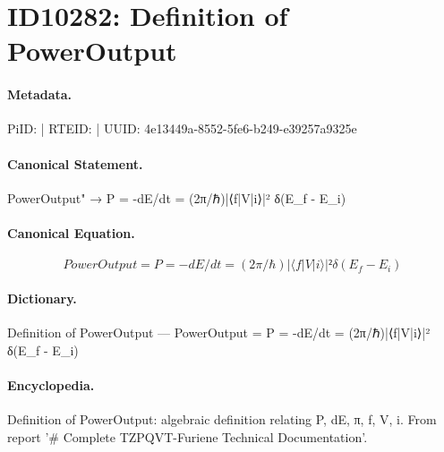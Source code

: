 \section*{ID10282: Definition of PowerOutput}
\paragraph{Metadata.}
PiID:  | RTEID:  | UUID: 4e13449a-8552-5fe6-b249-e39257a9325e

\paragraph{Canonical Statement.}
PowerOutput" → P = -dE/dt = (2π/ℏ)|⟨f|V|i⟩|² δ(E\_f - E\_i)

\paragraph{Canonical Equation.}
\[
PowerOutput = P = -dE/dt = (2π/ℏ)|⟨f|V|i⟩|² δ(E_f - E_i)
\]

\paragraph{Dictionary.}
Definition of PowerOutput — PowerOutput = P = -dE/dt = (2π/ℏ)|⟨f|V|i⟩|² δ(E\_f - E\_i)

\paragraph{Encyclopedia.}
Definition of PowerOutput: algebraic definition relating P, dE, π, f, V, i. From report '\# Complete TZPQVT-Furiene Technical Documentation'.
